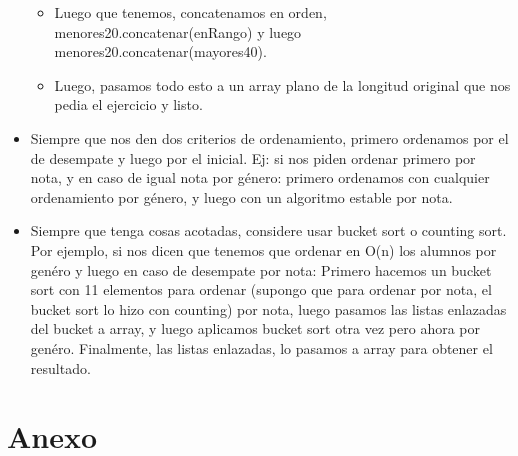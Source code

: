 \documentclass[10pt,a4paper]{article}
\begin{document}
\begin{itemize}
\begin{itemize}
        \item Luego que tenemos, concatenamos en orden, menores20.concatenar(enRango) y luego menores20.concatenar(mayores40).
        \item Luego, pasamos todo esto a un array plano de la longitud original que nos pedia el ejercicio y listo.
    \end{itemize}
    \item Siempre que nos den dos criterios de ordenamiento, primero ordenamos por el de desempate y luego por el inicial. Ej: si nos piden ordenar primero por nota, y en caso de igual nota por género: primero ordenamos con cualquier ordenamiento por género, y luego con un algoritmo estable por nota. 
    \item Siempre que tenga cosas acotadas, considere usar bucket sort o counting sort. Por ejemplo, si nos dicen que tenemos que ordenar en O(n) los alumnos por genéro y luego en caso de desempate por nota: Primero hacemos un bucket sort con 11 elementos para ordenar (supongo que para ordenar por nota, el bucket sort lo hizo con counting) por nota, luego pasamos las listas enlazadas del bucket a array, y luego aplicamos bucket sort otra vez pero ahora por genéro. Finalmente, las listas enlazadas, lo pasamos a array para obtener el resultado.
\end{itemize}
\section*{Anexo}
\end{document}
